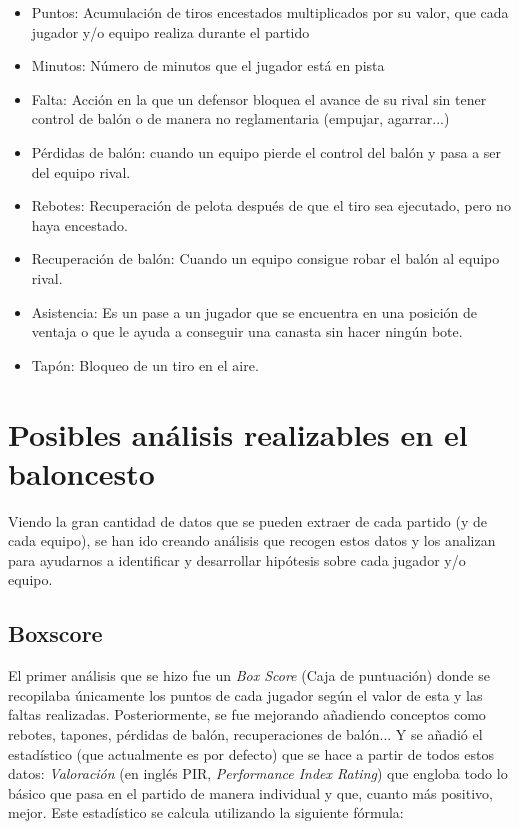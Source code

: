 \documentclass[paper=a4, fontsize=9pt]{article}
\begin{document}
\begin{itemize}

\item Puntos: Acumulación de tiros encestados multiplicados por su valor, que cada jugador y/o equipo realiza durante el partido
\item Minutos: Número de minutos que el jugador está en pista
\item Falta: Acción en la que un defensor bloquea el avance de su rival sin tener control de balón o de manera no reglamentaria (empujar, agarrar...)
\item Pérdidas de balón: cuando un equipo pierde el control del balón y pasa a ser del equipo rival.
\item Rebotes: Recuperación de pelota después de que el tiro sea ejecutado, pero no haya encestado.
\item Recuperación de balón: Cuando un equipo consigue robar el balón al equipo rival.
\item Asistencia: Es un pase a un jugador que se encuentra en una posición de ventaja o que le ayuda a conseguir una canasta sin hacer ningún bote.
\item Tapón: Bloqueo de un tiro en el aire.

\end{itemize}

\section{Posibles análisis realizables en el baloncesto}

Viendo la gran cantidad de datos que se pueden extraer de cada partido (y de cada equipo), se han ido creando análisis que recogen estos datos y los analizan para ayudarnos a identificar y desarrollar hipótesis sobre cada jugador y/o equipo.

\subsection{Boxscore}

El primer análisis que se hizo fue un \emph{Box Score} (Caja de puntuación) donde se recopilaba únicamente los puntos de cada jugador según el valor de esta y las faltas realizadas. Posteriormente, se fue mejorando añadiendo conceptos como rebotes, tapones, pérdidas de balón, recuperaciones de balón... Y se añadió el estadístico (que actualmente es por defecto) que se hace a partir de todos estos datos: \emph{Valoración} (en inglés PIR, \emph{Performance Index Rating}) que engloba todo lo básico que pasa en el partido de manera individual y que, cuanto más positivo, mejor. Este estadístico se calcula utilizando la siguiente fórmula:
\end{document}
